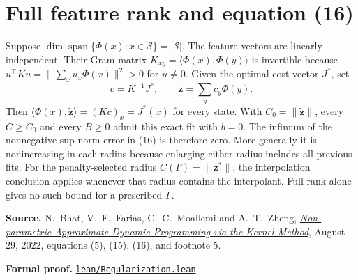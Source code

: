 \documentclass[12pt,a4paper]{article}
\newcommand{\ip}[2]{\langle #1,#2\rangle}
\newcommand{\norm}[1]{\lVert #1\rVert}
\newcommand{\vz}{\mathbf z}
\begin{document}
\section*{Full feature rank and equation (16)}
Suppose $\dim\operatorname{span}\{\Phi(x):x\in\mathcal S\}=|\mathcal S|$.
The feature vectors are linearly independent. Their Gram matrix
$K_{xy}=\ip{\Phi(x)}{\Phi(y)}$ is invertible because
$u^\top K u=\norm{\sum_x u_x\Phi(x)}^2>0$ for $u\ne0$.
Given the optimal cost vector $J^*$, set
\[
 c=K^{-1}J^*,\qquad \widetilde{\mathbf z}=\sum_y c_y\Phi(y).
\]
Then $\ip{\Phi(x)}{\widetilde{\mathbf z}}=(Kc)_x=J^*(x)$ for every state.
With $C_0=\norm{\widetilde{\mathbf z}}$, every $C\ge C_0$ and every $B\ge0$
admit this exact fit with $b=0$. The infimum of the nonnegative sup-norm
error in (16) is therefore zero. More generally it is nonincreasing in each
radius because enlarging either radius includes all previous fits.
For the penalty-selected radius $C(\Gamma)=\norm{\vz^*}$, the interpolation
conclusion applies whenever that radius contains the interpolant. Full rank
alone gives no such bound for a prescribed $\Gamma$.

\medskip
{\small\textbf{Source.} N.~Bhat, V.~F.~Farias, C.~C.~Moallemi and A.~T.~Zheng,
\href{https://moallemi.com/ciamac/papers/kernel-adp-2012.pdf\#page=11}{\emph{Non-parametric Approximate Dynamic Programming via the Kernel Method}},
August 29, 2022, equations (5), (15), (16), and footnote 5.\par
\textbf{Formal proof.} \href{https://github.com/nikhilpb/kadp/blob/main/lean/Regularization.lean}{\texttt{lean/Regularization.lean}}.}
\end{document}
